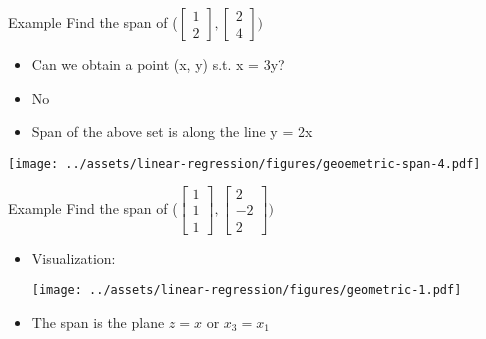 \documentclass{beamer}
\begin{document}
\begin{frame}{Example}
Find the span of ($\begin{bmatrix}
1 \\2
\end{bmatrix}, \begin{bmatrix}
2 \\4
\end{bmatrix}) $

\begin{itemize}[<+->]
    \item Can we obtain a point (x, y) s.t. x = 3y?
    \item No
    \item Span of the above set is along the line y = 2x
\end{itemize}

\texttt{[image: ../assets/linear-regression/figures/geoemetric-span-4.pdf]}


\end{frame}

\begin{frame}{Example}
Find the span of ($\begin{bmatrix}
1 \\1\\1
\end{bmatrix}, \begin{bmatrix}
2 \\-2\\2
\end{bmatrix}) $
\begin{itemize}[<+->]
    \item Visualization:
        \begin{center}
        \texttt{[image: ../assets/linear-regression/figures/geometric-1.pdf]}
        \end{center}
    \item The span is the plane $z=x$ or $x_3=x_1$
\end{itemize}
\end{frame}
\end{document}
